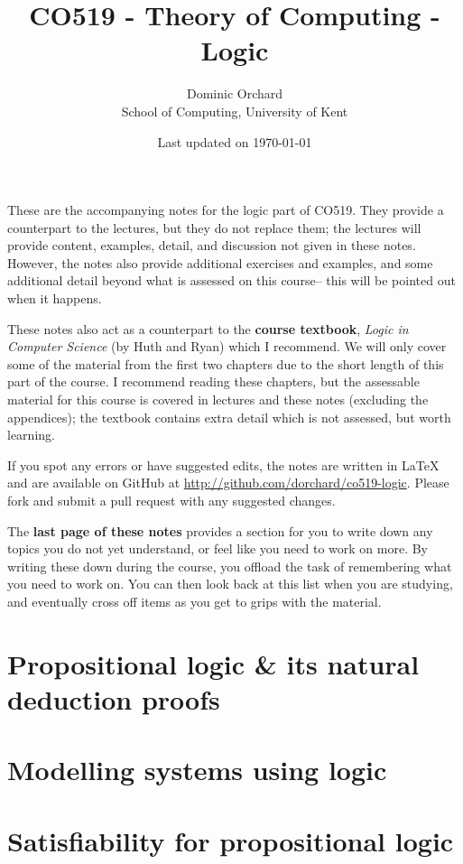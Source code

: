\documentclass[a4paper]{article}
\title{\vspace{-3em}CO519 - Theory of Computing - Logic}
\author{Dominic Orchard \\
  {\small{School of Computing, University of Kent}}}
\date{Last updated on \today}
\theoremstyle{definition}
\begin{document}
\maketitle

\noindent
These are the accompanying notes for the logic part of CO519. They
provide a counterpart to the lectures, but they do not replace them; the
lectures will provide content, examples, detail, and discussion not given in
these notes.  However, the notes also provide additional exercises and
examples, and some additional detail beyond what is assessed on this
course-- this will be pointed out when it happens.

These notes also act as a counterpart to the \textbf{course textbook},
\emph{Logic in Computer Science} (by Huth and Ryan) which I
recommend. We will only cover some of the material from the first two chapters due
to the short length of this part of the course. I recommend reading
these chapters, but the assessable material for this course is
covered in lectures and these notes (excluding the appendices); the
textbook contains extra detail which is not assessed, but
worth learning.

If you spot any errors or have suggested edits, the notes are written
in LaTeX and are available on GitHub at
\url{http://github.com/dorchard/co519-logic}. Please fork and submit a
pull request with any suggested changes.

The \textbf{last page of these notes} provides a section for you to
write down any topics you do not yet understand, or feel like you need
to work on more. By writing these down during the course, you offload
the task of remembering what you need to work on. You can then look
back at this list when you are studying, and eventually cross off items
as you get to grips with the material.

\part{Propositional logic \& its natural deduction
      proofs}



\part{Modelling systems using logic}
\setcounter{section}{0}



\part{Satisfiability for propositional logic}
\setcounter{section}{0}
\end{document}
